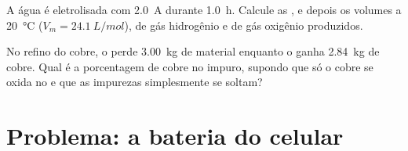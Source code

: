 \begin{exercise}[$\star\star\star$]\label{exo:g12:cells-and-electrolysis:14}
A água é eletrolisada com \qty{2.0}{A} durante \qty{1.0}{h}. Calcule as
, e depois os volumes a \qty{20}{\celsius} ($V_m = \qty{24.1}{L/mol}$),
de gás hidrogênio e de gás oxigênio produzidos.
\end{exercise}

\begin{exercise}[$\star\star\star$]\label{exo:g12:cells-and-electrolysis:15}
No refino do cobre, o  perde \qty{3.00}{kg} de material enquanto o
 ganha \qty{2.84}{kg} de cobre. Qual é a porcentagem de cobre no
 impuro, supondo que só o cobre se oxida no  e que as
impurezas simplesmente se soltam?
\end{exercise}

\section{Problema: a bateria do celular}

